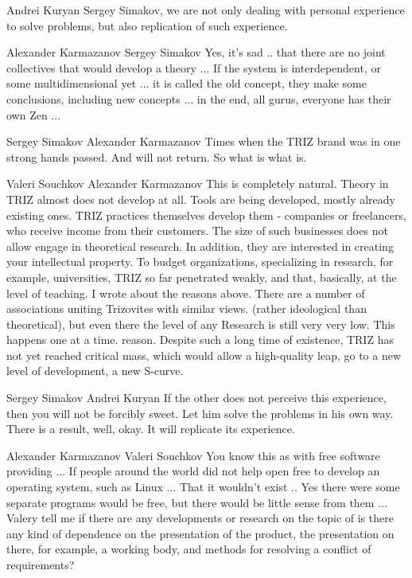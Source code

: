 \documentclass[11pt,a4paper]{article}
\begin{document}
Andrei Kuryan Sergey Simakov, we are not only dealing with personal experience
to solve problems, but also replication of such experience.

Alexander Karmazanov Sergey Simakov Yes, it's sad .. that there are no joint
collectives that would develop a theory ... If the system is interdependent,
or some multidimensional yet ... it is called the old concept, they make some
conclusions, including new concepts ... in the end, all gurus, everyone has
their own Zen ...

Sergey Simakov Alexander Karmazanov Times when the TRIZ brand was in one
strong hands passed. And will not return. So what is what is.

Valeri Souchkov Alexander Karmazanov This is completely natural. Theory in
TRIZ almost does not develop at all. Tools are being developed, mostly already
existing ones. TRIZ practices themselves develop them - companies or
freelancers, who receive income from their customers. The size of such
businesses does not allow engage in theoretical research. In addition, they
are interested in creating your intellectual property. To budget
organizations, specializing in research, for example, universities, TRIZ so
far penetrated weakly, and that, basically, at the level of teaching. I wrote
about the reasons above. There are a number of associations uniting Trizovites
with similar views.  (rather ideological than theoretical), but even there the
level of any Research is still very very low. This happens one at a time.
reason. Despite such a long time of existence, TRIZ has not yet reached
critical mass, which would allow a high-quality leap, go to a new level of
development, a new S-curve.

Sergey Simakov Andrei Kuryan If the other does not perceive this experience,
then you will not be forcibly sweet. Let him solve the problems in his own
way. There is a result, well, okay. It will replicate its experience.

Alexander Karmazanov Valeri Souchkov You know this as with free software
providing ... If people around the world did not help open free to develop an
operating system, such as Linux ... That it wouldn’t exist .. Yes there were
some separate programs would be free, but there would be little sense from
them ...  Valery tell me if there are any developments or research on the
topic of is there any kind of dependence on the presentation of the product,
the presentation on there, for example, a working body, and methods for
resolving a conflict of requirements?
\end{document}

